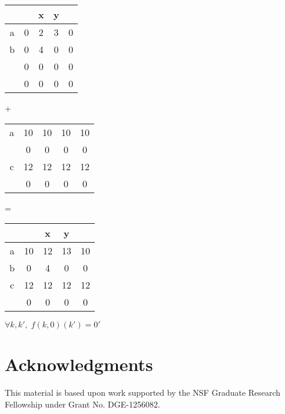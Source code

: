 \documentclass{sig-alternate} %
\begin{document}
\begin{figure*}[t]
\begin{tabular}{c|cccc}
  &   & x & y &   \\
\hline
a & 0 & 2 & 3 & 0 \\
b & 0 & 4 & 0 & 0 \\
  & 0 & 0 & 0 & 0 \\
  & 0 & 0 & 0 & 0 \\
\end{tabular}
+
\begin{tabular}{c|cccc}
  &   &  &  &   \\
\hline
a & 10 & 10 & 10 & 10 \\
  & 0 & 0 & 0 & 0 \\
c & 12 & 12 & 12 & 12 \\
  & 0 & 0 & 0 & 0 \\
\end{tabular}
=
\begin{tabular}{c|cccc}
  &   & x & y &   \\
\hline
a & 10 & 12 & 13 & 10 \\
b & 0 & 4 & 0 & 0 \\
c & 12 & 12 & 12 & 12 \\
 & 0 & 0 & 0 & 0 \\
\end{tabular}


$\forall k, k',\; f(k,0)(k') = 0'$ 

\end{figure*}

\section*{Acknowledgments}
{\footnotesize This material is based upon work supported by the NSF Graduate
Research Fellowship under Grant No. DGE-1256082.}

%
\nocite{hutchison2016lara}

{\small 

}
%
%
%
\end{document}
